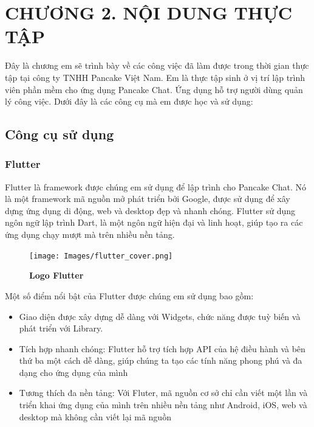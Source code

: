 \section*{CHƯƠNG 2. NỘI DUNG THỰC TẬP}
\setcounter{section}{2}
\setcounter{subsection}{0} %
\setcounter{table}{0} %
\setcounter{figure}{0} %

Đây là chương em sẽ trình bày về các công việc đã làm được trong thời gian thực tập tại công ty TNHH Pancake Việt Nam.
Em là thực tập sinh ở vị trí lập trình viên phần mềm cho ứng dụng Pancake Chat. Ứng dụng hỗ trợ người dùng quản lý
công việc. Dưới đây là các công cụ mà em được học và sử dụng:

\subsection{Công cụ sử dụng}
\subsubsection{Flutter}
Flutter là framework được chúng em sử dụng để lập trình cho Pancake Chat. Nó là một framework mã nguồn mở phát triển bởi Google, được sử dụng để xây dựng ứng dụng di động, web và desktop đẹp và nhanh chóng. 
Flutter sử dụng ngôn ngữ lập trình Dart, là một ngôn ngữ hiện đại và linh hoạt, giúp tạo ra các ứng dụng chạy mượt mà trên nhiều nền tảng.

\begin{figure}[H]
  \centering
  \texttt{[image: Images/flutter\_cover.png]}
  \caption[Logo Flutter]{\bfseries \fontsize{12pt}{0pt}
  \selectfont Logo Flutter}
  \label{flutter_cover} 
\end{figure}

Một số điểm nổi bật của Flutter được chúng em sử dụng bao gồm:

\begin{itemize}
  \item Giao diện được xây dựng dễ dàng với Widgets, chức năng được tuỳ biến và phát triển với Library.
  \item Tích hợp nhanh chóng: Flutter hỗ trợ tích hợp API của hệ điều hành và bên thứ ba một cách dễ dàng, giúp chúng ta tạo các tính năng phong phú và đa dạng cho ứng dụng của mình
  \item Tương thích đa nền tảng: Với Fluter, mã nguồn cơ sở chỉ cần viết một lần và triển khai ứng dụng của mình trên nhiều nền tảng như Android, iOS, web và desktop mà không cần viết lại mã nguồn
\end{itemize}
